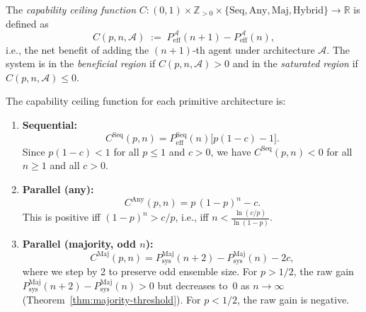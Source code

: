 \begin{definition}
\label{def:capability-ceiling}
The \emph{capability ceiling function} $C : (0,1) \times \mathbb{Z}_{>0} \times
\{\mathrm{Seq}, \mathrm{Any}, \mathrm{Maj}, \mathrm{Hybrid}\} \to \mathbb{R}$
is defined as
\[
  C(p, n, \mathcal{A}) \;:=\; P_{\mathrm{eff}}^{\mathcal{A}}(n+1)
    - P_{\mathrm{eff}}^{\mathcal{A}}(n),
\]
i.e., the net benefit of adding the $(n+1)$-th agent under architecture $\mathcal{A}$.
The system is in the \emph{beneficial region} if $C(p, n, \mathcal{A}) > 0$ and in the
\emph{saturated region} if $C(p, n, \mathcal{A}) \leq 0$.
\end{definition}

\begin{theorem}
\label{thm:ceiling-explicit}
The capability ceiling function for each primitive architecture is:
\begin{enumerate}
  \item \textbf{Sequential:}
  \[
    C^{\mathrm{Seq}}(p, n) = P_{\mathrm{eff}}^{\mathrm{Seq}}(n)\bigl[p(1-c) - 1\bigr].
  \]
  Since $p(1-c) < 1$ for all $p \leq 1$ and $c > 0$, we have
  $C^{\mathrm{Seq}}(p, n) < 0$ for all $n \geq 1$ and all $c > 0$.

  \item \textbf{Parallel (any):}
  \[
    C^{\mathrm{Any}}(p, n) = p\,(1-p)^n - c.
  \]
  This is positive iff $(1-p)^n > c/p$, i.e., iff
  $n < \frac{\ln(c/p)}{\ln(1-p)}$.

  \item \textbf{Parallel (majority, odd $n$):}
  \[
    C^{\mathrm{Maj}}(p, n) = P_{\mathrm{sys}}^{\mathrm{Maj}}(n+2) -
    P_{\mathrm{sys}}^{\mathrm{Maj}}(n) - 2c,
  \]
  where we step by 2 to preserve odd ensemble size. For $p > 1/2$, the raw gain
  $P_{\mathrm{sys}}^{\mathrm{Maj}}(n+2) - P_{\mathrm{sys}}^{\mathrm{Maj}}(n) > 0$
  but decreases to~$0$ as $n \to \infty$ (Theorem~\ref{thm:majority-threshold}).
  For $p < 1/2$, the raw gain is negative.
\end{enumerate}
\end{theorem}

